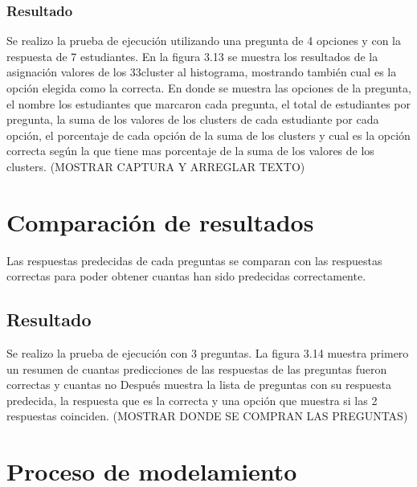 \subsubsection{Resultado}

Se realizo la prueba de ejecución utilizando una pregunta de 4 opciones y con la respuesta de 7 estudiantes. En la figura 3.13 se muestra los resultados de la asignación valores de los 33cluster al histograma, mostrando también cual es la opción elegida como la correcta. En donde se muestra las opciones de la pregunta, el nombre los estudiantes que marcaron cada pregunta,
el total de estudiantes por pregunta, la suma de los valores de los clusters de cada estudiante por cada opción, el porcentaje de cada opción de la suma de los clusters y cual es la opción correcta según la que tiene mas porcentaje de la suma de los valores de los clusters. (MOSTRAR CAPTURA Y ARREGLAR TEXTO)


\section{Comparación de resultados} 

Las respuestas predecidas de cada preguntas se comparan con las respuestas correctas para poder obtener cuantas han sido predecidas correctamente.

\subsection{Resultado}

Se realizo la prueba de ejecución con 3 preguntas. La figura 3.14 muestra primero un resumen de cuantas predicciones de las respuestas de las preguntas fueron correctas y cuantas no Después muestra la lista de preguntas con su respuesta predecida, la respuesta que es la correcta y una opción que muestra si las 2 respuestas coinciden.
(MOSTRAR DONDE SE COMPRAN LAS PREGUNTAS)





















\section{Proceso de modelamiento} 

